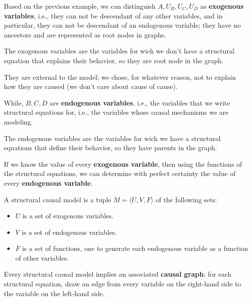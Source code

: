 Based on the previous example, we can distinguish $A, U_B, U_C, U_D$ as \textbf{
    exogenous variables}, i.e., they can not be descendant of any other variables,
and in particular, they can not be descendant of an endogenous variable; they have
no ancestors and are represented as root nodes in graphs.

\begin{definition}
    The exogenous variables are the variables for wich we don't have a structural equation
    that explains their behavior, so they are root node in the graph.
\end{definition}

They are external to the model; we chose, for whatever reason, not to explain how
they are caused (we don't care about cause of cause).

While, $B, C, D$ are \textbf{endogenous variables}, i.e., the variables that we write
structural equations for, i.e., the variables whose causal mechanisms we are modeling.

\begin{definition}
    The endogenous variables are the variables for wich we have a structural equations
    that define their behavior, so they have parents in the graph.
\end{definition}

If we know the value of every \textbf{exogenous variable}, then using the functions of the
structural equations, we can determine with perfect certainty the value of every
\textbf{endogenous variable}.

\begin{definition}
    A structural causal model is a tuple $M = \langle U, V, F \rangle$ of the following
    sets:
    \begin{itemize}
        \item $U$ is a set of exogenous variables.
        \item $V$ is a set of endogenous variables.
        \item $F$ is a set of functions, one to generate each endogenous variable as a
              function of other variables.
    \end{itemize}
\end{definition}

Every structural causal model implies an associated \textbf{causal graph}: for each
structural equation, draw an edge from every variable on the right-hand side to the
variable on the left-hand side.

